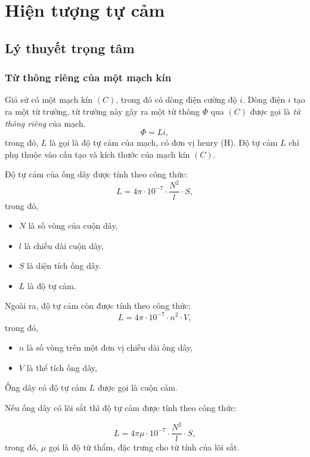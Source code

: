 \chapter{Hiện tượng tự cảm}
\section{Lý thuyết trọng tâm}
\subsection{Từ thông riêng của một mạch kín}
Giả sử có một mạch kín $(C)$, trong đó có dòng điện cường độ $i$. Dòng điện $i$ tạo ra một từ trường, từ trường này gây ra một từ thông $\Phi$ qua $(C)$ được gọi là \textit{từ thông riêng} của mạch.
\begin{equation}
\Phi=Li,
\end{equation}
trong đó, $L$ là gọi là độ tự cảm của mạch, có đơn vị henry (H). Độ tự cảm $L$  chỉ phụ thuộc vào cấu tạo và kích thước của mạch kín $(C)$. 

Độ tự cảm của ống dây được tính theo công thức:
\begin{equation}
L=4\pi \cdot 10^{-7}\cdot \dfrac{N^2}{l}\cdot S,
\end{equation}
trong đó,
\begin{itemize}
	\item $N$ là số vòng của cuộn dây,
	\item $l$ là chiều dài cuộn dây, 
	\item $S$ là diện tích ống dây.
	\item $L$ là độ tự cảm.
\end{itemize}

Ngoài ra, độ tự cảm còn được tính theo công thức:
\begin{equation}
L=4\pi \cdot 10^{-7}\cdot n^2 \cdot V,
\end{equation}
trong đó,
\begin{itemize}
	\item $n$ là số vòng trên một đơn vị chiều dài ống dây,
	\item $V$ là thể tích ống dây, 
\end{itemize}

Ống dây có độ tự cảm $L$ được gọi là cuộn cảm.  

Nếu ống dây có lõi sắt thì độ tự cảm được tính theo công thức:

\begin{equation}
L=4\pi\mu \cdot 10^{-7}\cdot \dfrac{N^2}{l}\cdot S,
\end{equation}
trong đó, $\mu$ gọi là độ từ thẩm, đặc trưng cho từ tính của lõi sắt.
